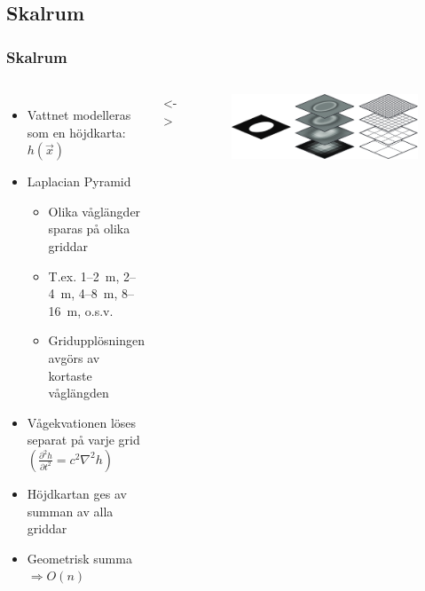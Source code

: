 \subsection{Skalrum}


\begin{frame}
\frametitle{Skalrum}

\begin{columns}[c]


\begin{itemize}[<+(1)->]
\item Vattnet modelleras som en höjdkarta: $h(\vec{x})$
\item Laplacian Pyramid
\setcounter{lppauses}{\thebeamerpauses}
    \begin{itemize}[<+(1)->]
    \item Olika våglängder sparas på olika griddar
    \item T.ex. \mbox{1--2 m}, \mbox{2--4 m}, \mbox{4--8 m}, \mbox{8--16 m}, o.s.v.
    \item Gridupplösningen avgörs av kortaste våglängden
    \end{itemize}
\item Vågekvationen löses separat på varje grid\\
$\left(\displaystyle \frac{\partial^2 h}{\partial t^2} = c^2\nabla^2h\right)$
\item Höjdkartan ges av summan av alla griddar
\item Geometrisk summa $\Rightarrow O(n)$
\end{itemize}


\uncover<\thelppauses->{
\begin{figure}
\centering
\includegraphics[width=\textwidth]{Images/Other/LPD}
\end{figure}
}

\end{columns}

\end{frame}